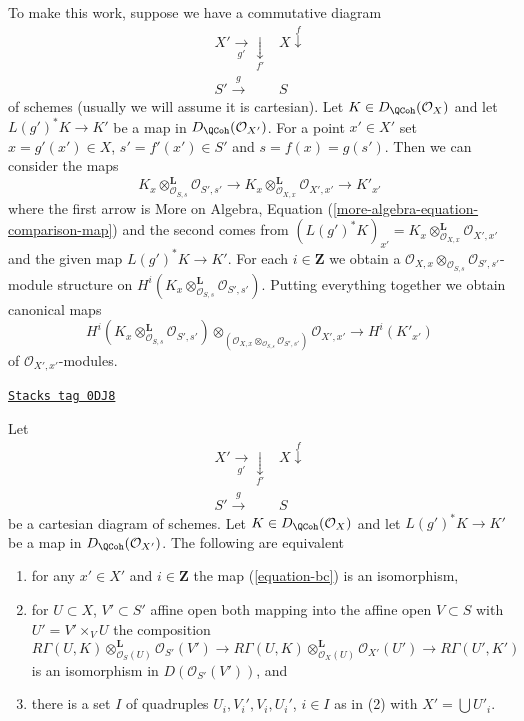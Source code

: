 \medskip\noindent
To make this work, suppose we have a commutative diagram
$$
\begin{array}{cc}X' \underset{g'}{\longrightarrow}\underset{f'}{\downarrow} & X \overset{f}{\downarrow} \\ S' \overset{g}{\longrightarrow} & S\end{array}
$$
of schemes (usually we will assume it is cartesian).
Let $K \in D_\QCoh(\mathcal{O}_X)$
and let $L(g')^*K \to K'$ be a map in $D_\QCoh(\mathcal{O}_{X'})$.
For a point $x' \in X'$ set $x = g'(x') \in X$,
$s' = f'(x') \in S'$ and $s = f(x) = g(s')$.
Then we can consider the maps
$$
K_x \otimes_{\mathcal{O}_{S, s}}^\mathbf{L} \mathcal{O}_{S', s'} \to
K_x \otimes_{\mathcal{O}_{X, x}}^\mathbf{L} \mathcal{O}_{X', x'} \to
K'_{x'}
$$
where the first arrow is More on Algebra,
Equation (\ref{more-algebra-equation-comparison-map})
and the second comes from
$(L(g')^*K)_{x'} =
K_x \otimes_{\mathcal{O}_{X, x}}^\mathbf{L} \mathcal{O}_{X', x'}$
and the given map $L(g')^*K \to K'$.
For each $i \in \mathbf{Z}$ we obtain a
$\mathcal{O}_{X, x} \otimes_{\mathcal{O}_{S, s}} \mathcal{O}_{S', s'}$-module
structure on
$H^i(K_x \otimes_{\mathcal{O}_{S, s}}^\mathbf{L} \mathcal{O}_{S', s'})$.
Putting everything together we obtain canonical maps
\begin{equation}
\label{equation-bc}
H^i(K_x \otimes_{\mathcal{O}_{S, s}}^\mathbf{L} \mathcal{O}_{S', s'})
\otimes_{(\mathcal{O}_{X, x} \otimes_{\mathcal{O}_{S, s}} \mathcal{O}_{S', s'})}
\mathcal{O}_{X', x'}
\longrightarrow
H^i(K'_{x'})
\end{equation}
of $\mathcal{O}_{X', x'}$-modules.

\begin{lemma}
\label{perfect-lemma-single-complex-base-change-condition}
\href{https://stacks.math.columbia.edu/tag/0DJ8}{\texttt{Stacks tag 0DJ8}}

Let
$$
\begin{array}{cc}X' \underset{g'}{\longrightarrow}\underset{f'}{\downarrow} & X \overset{f}{\downarrow} \\ S' \overset{g}{\longrightarrow} & S\end{array}
$$
be a cartesian diagram of schemes. Let $K \in D_\QCoh(\mathcal{O}_X)$
and let $L(g')^*K \to K'$ be a map in $D_\QCoh(\mathcal{O}_{X'})$.
The following are equivalent
\begin{enumerate}
\item for any $x' \in X'$ and $i \in \mathbf{Z}$ the map (\ref{equation-bc})
is an isomorphism,
\item for $U \subset X$, $V' \subset S'$ affine open both mapping
into the affine open $V \subset S$ with $U' = V' \times_V U$
the composition
$$
R\Gamma(U, K) \otimes_{\mathcal{O}_S(U)}^\mathbf{L} \mathcal{O}_{S'}(V')
\to
R\Gamma(U, K) \otimes_{\mathcal{O}_X(U)}^\mathbf{L} \mathcal{O}_{X'}(U')
\to
R\Gamma(U', K')
$$
is an isomorphism in $D(\mathcal{O}_{S'}(V'))$, and
\item there is a set $I$ of quadruples $U_i, V_i', V_i, U_i'$, $i \in I$
as in (2) with $X' = \bigcup U'_i$.
\end{enumerate}
\end{lemma}

